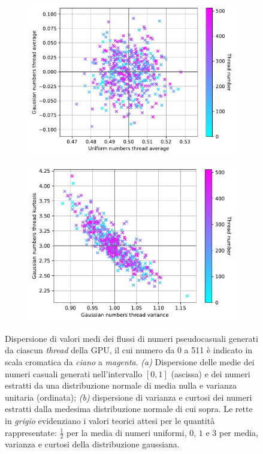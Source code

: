 \begin{figure}[t]
\centering
\begin{subfigure}{.5\textwidth}
  \centering
  \includegraphics[scale=0.5]{graphs/CorrelationTests_UniAvgVsGaussAvg.pdf}
  \caption{}
  \label{fig:unigauss_avg}
\end{subfigure}%
\begin{subfigure}{.5\textwidth}
  \centering
  \includegraphics[scale=0.5]{graphs/CorrelationTests_KurtosisVsVariance.pdf}
  \caption{}
  \label{fig:variance_kurt}
\end{subfigure}
\caption[Dispersione di valori medi dei flussi di numeri pseudocasuali generati da ciascun \textit{thread} della GPU.]{Dispersione di valori medi dei flussi di numeri pseudocasuali generati da ciascun \textit{thread} della GPU, il cui numero da 0 a 511 è indicato in scala cromatica da \textit{ciano} a \textit{magenta}. \textit{(a)} Dispersione delle medie dei numeri casuali generati nell'intervallo $[0,1]$ (ascissa) e dei numeri estratti da una distribuzione normale di media nulla e varianza unitaria (ordinata); \textit{(b)} dispersione di varianza e curtosi dei numeri estratti dalla medesima distribuzione normale di cui sopra. Le rette in \textit{grigio} evidenziano i valori teorici attesi per le quantità rappresentate: $\frac{1}{2}$ per la media di numeri uniformi, $0$, $1$ e $3$ per media, varianza e curtosi della distribuzione gaussiana.} 
\end{figure}

